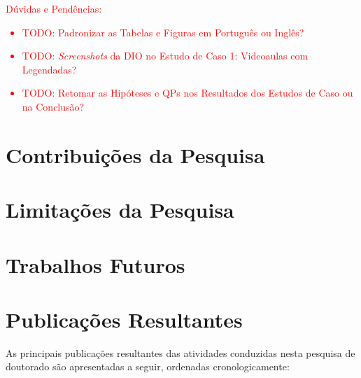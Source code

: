 
\noindent
\textcolor{red}{
Dúvidas e Pendências:
\begin{itemize}
    \item TODO: Padronizar as Tabelas e Figuras em Português ou Inglês?
    \item TODO: \textit{Screenshots} da DIO no Estudo de Caso 1: Videoaulas com Legendadas?
    \item TODO: Retomar as Hipóteses e QPs nos Resultados dos Estudos de Caso ou na Conclusão?
\end{itemize}
}

\section{Contribuições da Pesquisa}

\section{Limitações da Pesquisa}

\section{Trabalhos Futuros}

\section{Publicações Resultantes}

As principais publicações resultantes das atividades conduzidas nesta pesquisa de doutorado são apresentadas a seguir, ordenadas cronologicamente:

